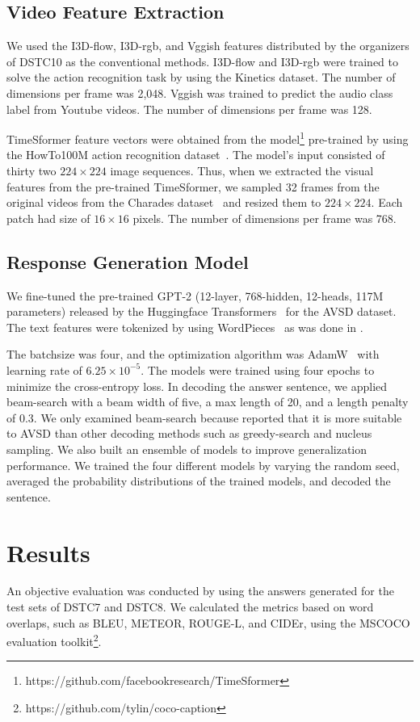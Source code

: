 \documentclass[letterpaper]{article}
\begin{document}
\subsection{Video Feature Extraction}
We used the I3D-flow, I3D-rgb, and Vggish features distributed by the organizers of DSTC10 as the conventional methods.
I3D-flow and I3D-rgb were trained to solve the action recognition task by using the Kinetics dataset.
The number of dimensions per frame was 2,048.
Vggish was trained to predict the audio class label from Youtube videos.
The number of dimensions per frame was 128.

TimeSformer feature vectors were obtained from the model\footnote{https://github.com/facebookresearch/TimeSformer} pre-trained by using the HowTo100M action recognition dataset~\cite{Miech2019howto100m}.
The model's input consisted of thirty two $224\times224$ image sequences.
Thus, when we extracted the visual features from the pre-trained TimeSformer, we sampled 32 frames from the original videos from the Charades dataset~\cite{Sigurdsson2016hollywood} and resized them to $224\times224$.
Each patch had size of $16\times16$ pixels.
The number of dimensions per frame was 768.


\subsection{Response Generation Model}
We fine-tuned the pre-trained GPT-2 (12-layer, 768-hidden, 12-heads, 117M parameters) released by the Huggingface Transformers~\cite{Wolf2020transformers} for the AVSD dataset.
The text features were tokenized by using WordPieces~\cite{Wu2016googles} as was done in \citet{Li2021bridging}.

The batchsize was four, and the optimization algorithm was AdamW~\cite{Loshchilov2017decoupled} with learning rate of $6.25 \times 10^{-5}$.
The models were trained using four epochs to minimize the cross-entropy loss.
In decoding the answer sentence, we applied beam-search with a beam width of five, a max length of 20, and a length penalty of 0.3.
We only examined beam-search because \citet{Li2021bridging} reported that it is more suitable to AVSD than other decoding methods such as greedy-search and nucleus sampling.
We also built an ensemble of models to improve generalization performance.
We trained the four different models by varying the random seed, averaged the probability distributions of the trained models, and decoded the sentence.


\section{Results}
An objective evaluation was conducted by using the answers generated for the test sets of DSTC7 and DSTC8.
We calculated the metrics based on word overlaps, such as BLEU, METEOR, ROUGE-L, and CIDEr, using the MSCOCO evaluation toolkit\footnote{https://github.com/tylin/coco-caption}.
\end{document}
